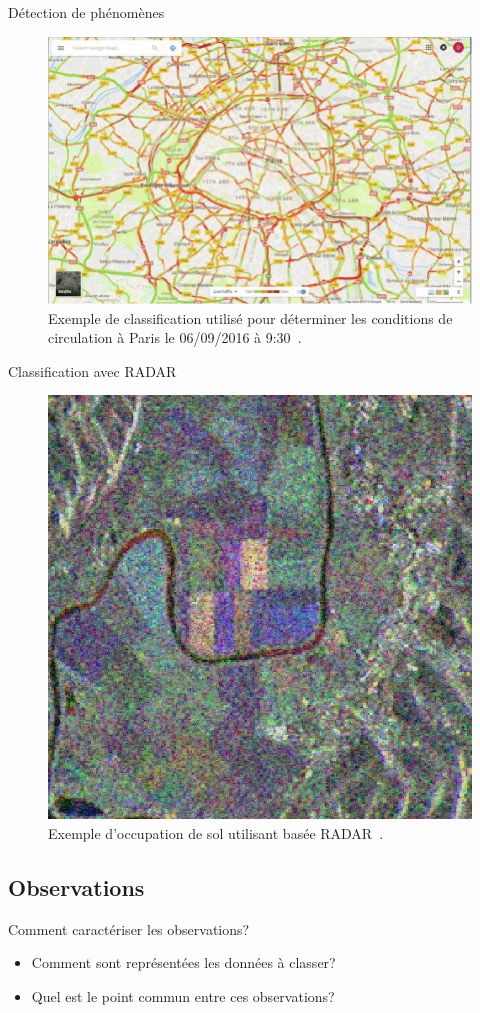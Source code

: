 \documentclass[8pt]{beamer}
\begin{document}
			\begin{frame}{Détection de phénomènes}
				\begin{figure}[H]
					\includegraphics[width=.65\textwidth]{images/samples/traffic_paris}
					\caption*{\tiny Exemple de classification utilisé pour déterminer les conditions de circulation à Paris le 06/09/2016 à 9:30~\cite{tutic2016google}.}
				\end{figure}
			\end{frame}

			\begin{frame}{Classification avec RADAR}
				\begin{figure}[H]
					\includegraphics[width=.45\textwidth]{images/samples/radar}
					\caption*{\tiny Exemple d'occupation de sol utilisant basée RADAR~\cite{EsaRadar}.}
				\end{figure}
			\end{frame}

		\subsection{Observations}
			\begin{frame}{Comment caractériser les observations?}
				\begin{itemize}
					\item<1-> Comment sont représentées les données à classer?
					\item<2-> Quel est le point commun entre ces observations?
				\end{itemize}
			\end{frame}
		
\end{document}
